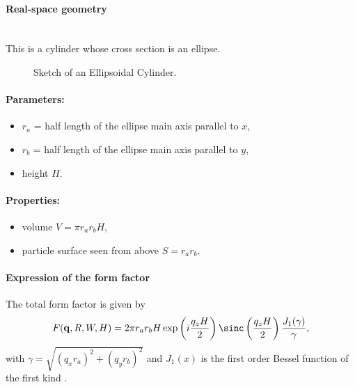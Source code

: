 \paragraph{Real-space geometry}\mbox{}\\
This is a cylinder whose cross section is an ellipse.

\begin{figure}[ht]
\hfill
{}
\hfill
{}
\hfill
\caption{Sketch of an Ellipsoidal Cylinder.}
\label{fig:ellipscylinder}
\end{figure}

\paragraph{Parameters:}
\begin{itemize}
\item $r_a$ = half length of the ellipse main axis parallel to $x$,
\item$r_b$ = half length of the ellipse main axis parallel to $y$, 
\item height $H$.
\end{itemize}

\paragraph{Properties:}
\begin{itemize}
\item volume $V = \pi r_a r_bH$,
\item particle surface seen from above $S = r_a r_b$.
\end{itemize}

\paragraph{Expression of the form factor}
The total form factor is given by 
\begin{equation*}
F(\mathbf{q},R,W,H) = 2\pi r_a r_b H \exp\left(i\frac{q_z
  H}{2}\right)\sinc\left(\frac{q_z H}{2}\right) \frac{J_1(\gamma)}{\gamma},
\end{equation*}
with $\gamma=\sqrt{(q_x r_a)^2+(q_y r_b)^2}$ and $J_1(x)$ is the first order
Bessel function of the first kind \cite{AbSt64}.

